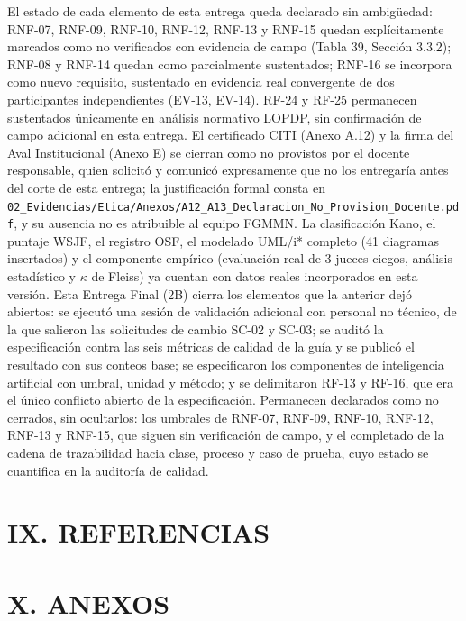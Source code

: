 El estado de cada elemento de esta entrega queda declarado sin ambigüedad: RNF-07, RNF-09, RNF-10, RNF-12, RNF-13 y RNF-15 quedan explícitamente marcados como no verificados con evidencia de campo (Tabla 39, Sección 3.3.2); RNF-08 y RNF-14 quedan como parcialmente sustentados; RNF-16 se incorpora como nuevo requisito, sustentado en evidencia real convergente de dos participantes independientes (EV-13, EV-14). RF-24 y RF-25 permanecen sustentados únicamente en análisis normativo LOPDP, sin confirmación de campo adicional en esta entrega. El certificado CITI (Anexo A.12) y la firma del Aval Institucional (Anexo E) se cierran como no provistos por el docente responsable, quien solicitó y comunicó expresamente que no los entregaría antes del corte de esta entrega; la justificación formal consta en \nolinkurl{02_Evidencias/Etica/Anexos/A12_A13_Declaracion_No_Provision_Docente.pdf}, y su ausencia no es atribuible al equipo FGMMN. La clasificación Kano, el puntaje WSJF, el registro OSF, el modelado UML/i* completo (41 diagramas insertados) y el componente empírico (evaluación real de 3 jueces ciegos, análisis estadístico y $\kappa$ de Fleiss) ya cuentan con datos reales incorporados en esta versión. Esta Entrega Final (2B) cierra los elementos que la anterior dejó abiertos: se ejecutó una sesión de validación adicional con personal no técnico, de la que salieron las solicitudes de cambio SC-02 y SC-03; se auditó la especificación contra las seis métricas de calidad de la guía y se publicó el resultado con sus conteos base; se especificaron los componentes de inteligencia artificial con umbral, unidad y método; y se delimitaron RF-13 y RF-16, que era el único conflicto abierto de la especificación. Permanecen declarados como no cerrados, sin ocultarlos: los umbrales de RNF-07, RNF-09, RNF-10, RNF-12, RNF-13 y RNF-15, que siguen sin verificación de campo, y el completado de la cadena de trazabilidad hacia clase, proceso y caso de prueba, cuyo estado se cuantifica en la auditoría de calidad.


\section*{IX. REFERENCIAS}


\nocite{*}



\section*{X. ANEXOS}

